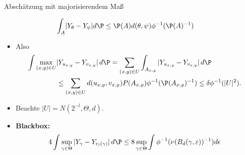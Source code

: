 \begin{frame}{Abschätzung mit majorisierendem Maß}
    \begin{proofs}
    \small
    \vspace{-0.5cm}
\begin{align*}
            \int_A &|Y_\theta-Y_\psi| d\P \leq \P(A)d(\theta, \psi)\phi^{-1}(\P(A)^{-1})
        \end{align*}
    \begin{itemize}
\item \normalsize Also \small \begin{align*}
    \int \max_{(x,y) \in U}& |Y_{u_{x,y}}- Y_{v_{x,y}}| \,d\P = \sum_{(x,y) \in U} \int_{A_{x,y}} |Y_{u_{x,y}}- Y_{v_{x,y}}| \,d\P \\&\leq \sum_{(x,y) \in U} d(u_{x,y}, v_{x,y}) P(A_{x,y}) \phi^{-1}(\P(A_{x,y})^{-1}) \leq \delta \phi^{-1}(|U|^2).
\end{align*}
    \item \normalsize Beachte $|U| = N(2^{-l}, \Theta, d)$.
    \item \textbf{Blackbox: } \small \[4 \int \sup_{\gamma \in \Theta}|Y_\gamma - Y_{r_l(\gamma)}| \,d\P\leq 8 \sup_{\gamma \in \Theta} \int \phi^{-1}(\nu(B_d(\gamma, \varepsilon))^{-1}) d\epsilon\]
    \end{itemize}
    \end{proofs}
\end{frame}

